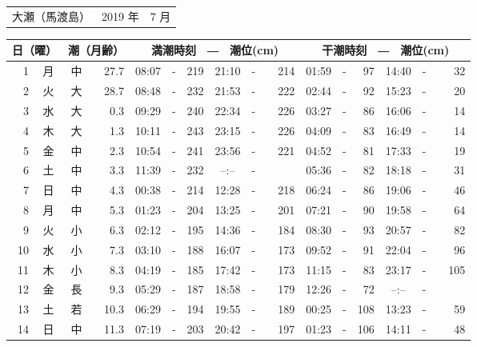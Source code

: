 \documentclass[12pt. a4j]{jsarticle}
\begin{document}
\pagestyle{empty}
 \begin{table}[htbp]
 \begin{center}
 \begin{tabular}{lcc}
 \LARGE{大瀬（馬渡島）}  & \large{ 2019 年 } & \large{  7 月} \\
 \end{tabular}
 \end{center}
    \begin{center}
    \begin{tabular}{|rc|cr|ccrccr|ccrccr|}
    \hline
    \multicolumn{2}{|c|}{日（曜）} & \multicolumn{2}{c|}{潮（月齢）} & \multicolumn{6}{c|}{満潮時刻　―　潮位(cm)} & \multicolumn{6}{c|}{干潮時刻　―　潮位(cm)} \\
 \hline
 1 & 月 & 中 & 27.7 &  08:07 &-& 219  &  21:10 &-& 214  &  01:59 &-&  97  &  14:40 &-&  32  \\
 2 & 火 & 大 & 28.7 &  08:48 &-& 232  &  21:53 &-& 222  &  02:44 &-&  92  &  15:23 &-&  20  \\
 3 & 水 & 大 &  0.3 &  09:29 &-& 240  &  22:34 &-& 226  &  03:27 &-&  86  &  16:06 &-&  14  \\
 4 & 木 & 大 &  1.3 &  10:11 &-& 243  &  23:15 &-& 226  &  04:09 &-&  83  &  16:49 &-&  14  \\
 5 & 金 & 中 &  2.3 &  10:54 &-& 241  &  23:56 &-& 221  &  04:52 &-&  81  &  17:33 &-&  19  \\
 6 & 土 & 中 &  3.3 &  11:39 &-& 232  &  --:-- &-&~~~~~ &  05:36 &-&  82  &  18:18 &-&  31  \\
 7 & 日 & 中 &  4.3 &  00:38 &-& 214  &  12:28 &-& 218  &  06:24 &-&  86  &  19:06 &-&  46  \\
 8 & 月 & 中 &  5.3 &  01:23 &-& 204  &  13:25 &-& 201  &  07:21 &-&  90  &  19:58 &-&  64  \\
 9 & 火 & 小 &  6.3 &  02:12 &-& 195  &  14:36 &-& 184  &  08:30 &-&  93  &  20:57 &-&  82  \\
10 & 水 & 小 &  7.3 &  03:10 &-& 188  &  16:07 &-& 173  &  09:52 &-&  91  &  22:04 &-&  96  \\
11 & 木 & 小 &  8.3 &  04:19 &-& 185  &  17:42 &-& 173  &  11:15 &-&  83  &  23:17 &-& 105  \\
12 & 金 & 長 &  9.3 &  05:29 &-& 187  &  18:58 &-& 179  &  12:26 &-&  72  &  --:-- &-&~~~~~ \\
13 & 土 & 若 & 10.3 &  06:29 &-& 194  &  19:55 &-& 189  &  00:25 &-& 108  &  13:23 &-&  59  \\
14 & 日 & 中 & 11.3 &  07:19 &-& 203  &  20:42 &-& 197  &  01:23 &-& 106  &  14:11 &-&  48  \\

\end{tabular}
\end{center}
\end{table}
\end{document}

